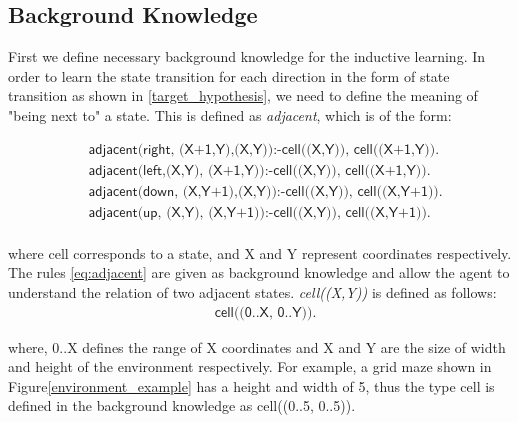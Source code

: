 \subsection{Background Knowledge}
\label{subsec:background_knowledge}
First we define necessary background knowledge for the inductive learning.
In order to learn the state transition for each direction in the form of state transition as shown in \ref{target_hypothesis}, we need to define the meaning of "being next to" a state.
This is defined as \textit{adjacent}, which is of the form:

\begin{equation} \label{eq:adjacent}
\begin{split}
&\textsf{adjacent(right, (X+1,Y),(X,Y)):-cell((X,Y)), cell((X+1,Y)).} \\
&\textsf{adjacent(left,(X,Y),  (X+1,Y)):-cell((X,Y)), cell((X+1,Y)).} \\
&\textsf{adjacent(down, (X,Y+1),(X,Y)):-cell((X,Y)), cell((X,Y+1)).} \\
&\textsf{adjacent(up,   (X,Y),  (X,Y+1)):-cell((X,Y)), cell((X,Y+1)).} \\
\end{split}
\end{equation}

where \textsf{cell} corresponds to a state, and \textsf{X} and \textsf{Y} represent coordinates respectively.
The rules \ref{eq:adjacent} are given as background knowledge and allow the agent to understand the relation of two adjacent states.
\textit{cell((X,Y))} is defined as follows:
\begin{equation} \label{eq:cell}
\begin{split}
    &\textsf{cell((0..X, 0..Y)).}
\end{split}
\end{equation}

where, 0..X defines the range of X coordinates and X and Y are the size of width and height of the environment respectively. 
For example, a grid maze shown in Figure\ref{environment_example} has a height and width of 5, thus the type cell is defined in the background knowledge as \textsf{cell((0..5, 0..5))}.



